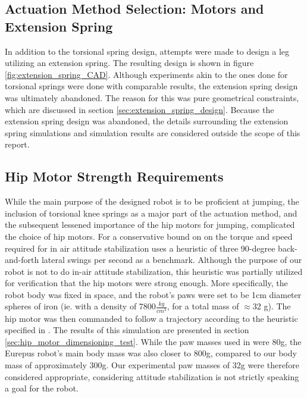 \subsection{Actuation Method Selection: Motors and Extension Spring}

In addition to the torsional spring design, attempts were made to design a leg utilizing an extension spring. The resulting design is shown in figure \ref{fig:extension_spring_CAD}. Although experiments akin to the ones done for torsional springs were done with comparable results, the extension spring design was ultimately abandoned. The reason for this was pure geometrical constraints, which are discussed in section \ref{sec:extension_spring_design}. Because the extension spring design was abandoned, the details surrounding the extension spring simulations and simulation results are considered outside the scope of this report.

\subsection{Hip Motor Strength Requirements}
\label{sec:hip_motor_dimensioning_test_design}

While the main purpose of the designed robot is to be proficient at jumping, the inclusion of torsional knee springs as a major part of the actuation method, and the subsequent lessened importance of the hip motors for jumping, complicated the choice of hip motors. For a conservative bound on on the torque and speed required for in air attitude stabilization
 \cite{finn_tarek_master} uses a heuristic of three 90-degree back-and-forth lateral swings per second as a benchmark. Although the purpose of our robot is not to do in-air attitude stabilization, this heuristic was partially utilized for verification that the hip motors were strong enough. More specifically, the robot body was fixed in space, and the robot's paws were set to be 1cm diameter spheres of iron (ie. with a density of 7800$\frac{kg}{cm^3}$, for a total mass of $\approx$32 g). The hip motor was then commanded to follow a trajectory according to the heuristic specified in \cite{finn_tarek_master}. The results of this simulation are presented in section \ref{sec:hip_motor_dimensioning_test}. While the paw masses used in \cite{finn_tarek_master} were 80g, the Eurepus robot's main body mass was also closer to 800g, compared to our body mass of approximately 300g. Our experimental paw masses of 32g were therefore considered appropriate, considering attitude stabilization is not strictly speaking a goal for the robot. 